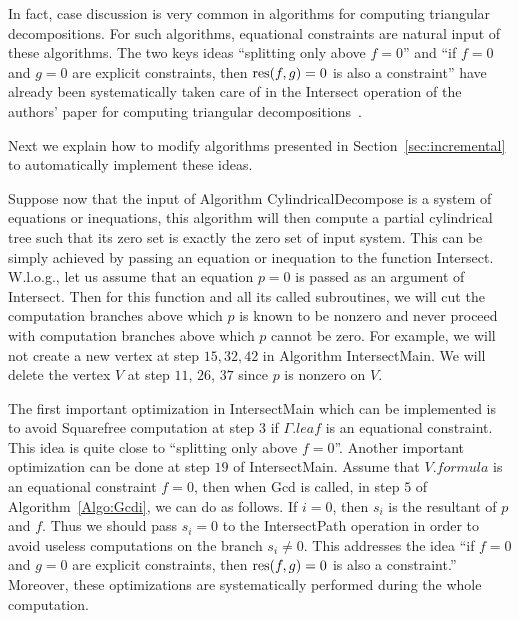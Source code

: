 \documentclass[10pt]{article}
\newcommand{\res}[1]{\mbox{{\rm res}$(#1)$}}
\begin{document}
In fact, case discussion is very common in algorithms for computing 
triangular decompositions.
For such algorithms, equational constraints are natural input of these algorithms. 
The two keys ideas ``splitting only above $f=0$'' and  ``if $f=0$ and $g=0$ are explicit constraints, 
then $\res{f,g}=0$ is also a constraint'' have already been systematically 
taken care of in the {\sf Intersect} operation of the authors' paper
for  computing triangular decompositions~\cite{CM11}.

Next we explain how to modify algorithms presented in Section~\ref{sec:incremental} to 
automatically implement these ideas.

Suppose now that the input of Algorithm {\sf CylindricalDecompose} is a 
system of equations or inequations, 
this algorithm will then compute a partial cylindrical tree 
such that its zero set is exactly the zero set of input system.
This can be simply achieved by passing an equation or inequation 
to the function {\sf Intersect}.
W.l.o.g., let us assume that an equation $p=0$ is passed as 
an argument of {\sf Intersect}.
Then for this function and all its called subroutines, 
we will cut the computation branches above which $p$ is known to be nonzero 
and never proceed with computation branches above which $p$ cannot be zero.
For example, we will not create a new vertex at step $15, 32, 42$ 
in Algorithm {\sf IntersectMain}.
We will delete the vertex $V$ at step $11$, $26$, $37$ since $p$ is nonzero on $V$.

The first important optimization in {\sf IntersectMain} which can be implemented 
is to avoid {\sf Squarefree} computation at step $3$ if $\Gamma.leaf$
is an equational constraint.
This idea is quite close to ``splitting only above $f=0$''.
Another important optimization can be done 
at step $19$ of {\sf IntersectMain}. 
Assume that $V.formula$ is an equational constraint $f=0$, 
then when {\sf Gcd} is called, 
in step $5$ of Algorithm~\ref{Algo:Gcdi},
we can do as follows. 
If $i=0$, then $s_i$ is the resultant of $p$ and $f$.
Thus we should pass $s_i=0$ to the {\sf IntersectPath} operation
in order to avoid useless computations 
on the branch $s_i\neq 0$.
This addresses the idea ``if $f=0$ and $g=0$ are explicit constraints, 
then $\res{f,g}=0$ is also a constraint.''
Moreover, these optimizations are systematically performed during the whole 
computation.
\end{document}

